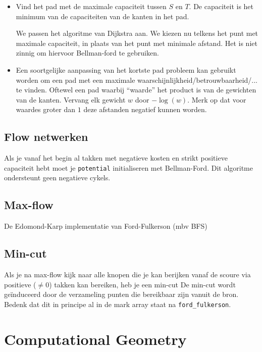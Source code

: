 \documentclass[10pt,a4paper,titlepage]{article}
\begin{document}
\begin{itemize}[noitemsep,nolistsep]
\item Vind het pad met de maximale capaciteit tussen $S$ en $T$. De capaciteit is het minimum van de capaciteiten van de kanten in het pad.

We passen het algoritme van Dijkstra aan. We kiezen nu telkens het punt met maximale capaciteit, in plaats van het punt met minimale afstand. Het is niet zinnig om hiervoor Bellman-ford te gebruiken.

\item Een soortgelijke aanpassing van het kortste pad probleem kan gebruikt worden om een pad met een maximale waarschijnlijkheid/betrouwbaarheid/... te vinden. Oftewel een pad waarbij ``waarde'' het product is van de gewichten van de kanten. Vervang elk gewicht $w$ door $-\log(w)$. Merk op dat voor waardes groter dan $1$ deze afstanden negatief kunnen worden.

\end{itemize}

\fi

\subsection{Flow netwerken}


 
 Als je vanaf het begin al takken met negatieve kosten en strikt positieve capaciteit hebt moet je \texttt{potential} initialiseren met Bellman-Ford. Dit algoritme ondersteunt geen negatieve cykels.
 
\subsection{Max-flow}
De Edomond-Karp implementatie van Ford-Fulkerson (mbv BFS)

\subsection{Min-cut}
Als je na max-flow kijk naar alle knopen die je kan berijken vanaf de scoure via positieve ($\not=0$) takken kan bereiken, heb je een min-cut
De min-cut wordt ge\"{i}nduceerd door de verzameling punten die bereikbaar zijn vanuit de bron. Bedenk dat dit in principe al in de mark array staat na \texttt{ford\_fulkerson}.

\section{Computational Geometry}
\end{document}
